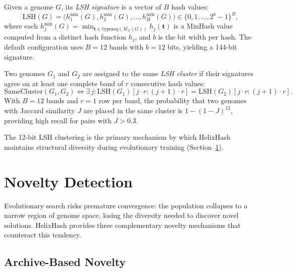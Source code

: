\begin{definition}
\label{def:lsh-signature}
Given a genome $G$, its \emph{LSH signature} is a vector of $B$ hash values:
\begin{equation}
\mathrm{LSH}(G) = \bigl(h_1^{\min}(G), h_2^{\min}(G), \ldots, h_B^{\min}(G)\bigr) \in \{0, 1, \ldots, 2^b - 1\}^B,
\end{equation}
where each $h_j^{\min}(G) = \min_{\mathbf{t} \in \mathrm{typeseq}(\mathcal{M}_k(G))} h_j(\mathbf{t})$ is a MinHash value computed from a distinct hash function $h_j$, and $b$ is the bit width per hash. The default configuration uses $B = 12$ bands with $b = 12$ bits, yielding a 144-bit signature.
\end{definition}

\begin{dogmadef}
Two genomes $G_1$ and $G_2$ are assigned to the same \emph{LSH cluster} if their signatures agree on at least one complete band of $r$ consecutive hash values:
\begin{equation}
\mathrm{SameCluster}(G_1, G_2) \iff \exists\, j : \mathrm{LSH}(G_1)[j \cdot r : (j+1) \cdot r] = \mathrm{LSH}(G_2)[j \cdot r : (j+1) \cdot r].
\end{equation}
With $B = 12$ bands and $r = 1$ row per band, the probability that two genomes with Jaccard similarity $J$ are placed in the same cluster is $1 - (1 - J)^{12}$, providing high recall for pairs with $J > 0.3$.
\end{dogmadef}

The 12-bit LSH clustering is the primary mechanism by which HelixHash maintains structural diversity during evolutionary training (Section~\ref{sec:novelty-diversity}).

\section{Novelty Detection}
\label{sec:novelty-diversity}

Evolutionary search risks premature convergence: the population collapses to a narrow region of genome space, losing the diversity needed to discover novel solutions. HelixHash provides three complementary novelty mechanisms that counteract this tendency.

\subsection{Archive-Based Novelty}

